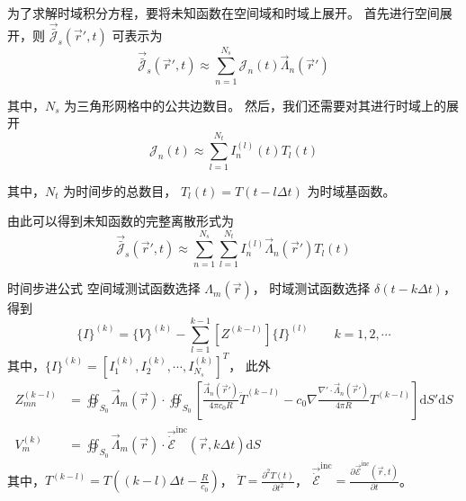 \par 为了求解时域积分方程，要将未知函数在空间域和时域上展开。
首先进行空间展开，则 $\vec{\bar{\mathscr{J}}}_s\left(\vec{r}',t\right)$ 可表示为
\begin{equation}
    \vec{\bar{\mathscr{J}}}_s\left(\vec{r}',t\right)
    \approx\sum_{n=1}^{N_s} \mathscr{J}_n(t) \vec{\Lambda}_n(\vec{r}')
\end{equation}
\par 其中，$N_s$ 为三角形网格中的公共边数目。
然后，我们还需要对其进行时域上的展开
\begin{equation}
    \mathscr{J}_n(t)
    \approx\sum_{l=1}^{N_t} 
    I_n^{(l)}(t)T_l(t)
\end{equation}
\par 其中，$N_t$ 为时间步的总数目，
$T_l(t)=T(t-l\Delta t)$ 为时域基函数。
\par 由此可以得到未知函数的完整离散形式为
\begin{equation}
    \vec{\bar{\mathscr{J}}}_s\left(\vec{r}',t\right)
    \approx\sum_{n=1}^{N_s} 
    \sum_{l=1}^{N_t} 
    I_n^{(l)} \vec{\Lambda}_n(\vec{r}')T_l(t)
\end{equation}

\begin{theorem}{时间步进公式}
    空间域测试函数选择 $\Lambda_m(\vec{r})$，
    时域测试函数选择 $\delta(t-k\Delta t)$，得到
    \begin{equation}
        [Z^{(0)}]\{I\}^{(k)}
        =\{V\}^{(k)}-\sum_{l=1}^{k-1}[Z^{(k-l)}]\{I\}^{(l)}
        \qquad 
        k=1,2,\cdots
    \end{equation}
    其中，$\{I\}^{(k)}
    =[I_1^{(k)},I_2^{(k)},\cdots,I_{N_s}^{(k)}]^T$，
    此外
    \begin{align}
        Z_{mn}^{(k-l)}
        &=\oiint_{S_0}
        \vec{\Lambda}_m(\vec{r})\cdot
        \oiint_{S_0}
        \left[
            \frac{\vec{\Lambda}_n(\vec{r}')}{4\pi c_0 R}
            \ddot{T}^{(k-l)}-c_0\nabla 
            \frac{\nabla' \cdot \vec{\Lambda}_n(\vec{r}')}{4\pi R}T^{(k-l)}
        \right]\text{d}S'\text{d}S\\
        V_m^{(k)}
        &=\oiint_{S_0}
        \vec{\Lambda}_m(\vec{r})\cdot
        \vec{\dot{\mathscr{E}}}^{\text{inc}}(\vec{r},k\Delta t)\text{d}S
    \end{align}
    其中，$T^{(k-l)}=
    T\left((k-l)\Delta t - \frac{R}{c_0}\right)$，
    $\ddot{T}=\frac{\partial^2 T(t)}{\partial t^2}$，
    $\vec{\dot{\mathscr{E}}}^{\text{inc}}
    =\frac{\partial \vec{\mathscr{E}}^{\text{inc}}(\vec{r},t)}{\partial t}$。
\end{theorem}